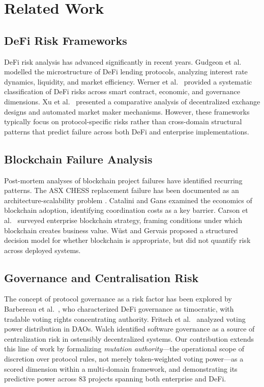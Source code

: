 \documentclass[conference]{IEEEtran}
\begin{document}
\section{Related Work}

\subsection{DeFi Risk Frameworks}

DeFi risk analysis has advanced significantly in recent years. Gudgeon et al.\ \cite{gudgeon2020} modelled the microstructure of DeFi lending protocols, analyzing interest rate dynamics, liquidity, and market efficiency. Werner et al.\ \cite{werner2022} provided a systematic classification of DeFi risks across smart contract, economic, and governance dimensions. Xu et al.\ \cite{xu2023} presented a comparative analysis of decentralized exchange designs and automated market maker mechanisms. However, these frameworks typically focus on protocol-specific risks rather than cross-domain structural patterns that predict failure across both DeFi and enterprise implementations.

\subsection{Blockchain Failure Analysis}

Post-mortem analyses of blockchain project failures have identified recurring patterns. The ASX CHESS replacement failure has been documented as an architecture-scalability problem \cite{asx2022}. Catalini and Gans \cite{catalini2020} examined the economics of blockchain adoption, identifying coordination costs as a key barrier. Carson et al.\ \cite{carson2018} surveyed enterprise blockchain strategy, framing conditions under which blockchain creates business value. W\"ust and Gervais \cite{wust2018} proposed a structured decision model for whether blockchain is appropriate, but did not quantify risk across deployed systems.

\subsection{Governance and Centralisation Risk}

The concept of protocol governance as a risk factor has been explored by Barbereau et al.\ \cite{barbereau2022}, who characterized DeFi governance as timocratic, with tradable voting rights concentrating authority. Fritsch et al.\ \cite{fritsch2024} analyzed voting power distribution in DAOs. Walch \cite{walch2019} identified software governance as a source of centralization risk in ostensibly decentralized systems. Our contribution extends this line of work by formalizing \textit{mutation authority}---the operational scope of discretion over protocol rules, not merely token-weighted voting power---as a scored dimension within a multi-domain framework, and demonstrating its predictive power across 83 projects spanning both enterprise and DeFi.
\end{document}
